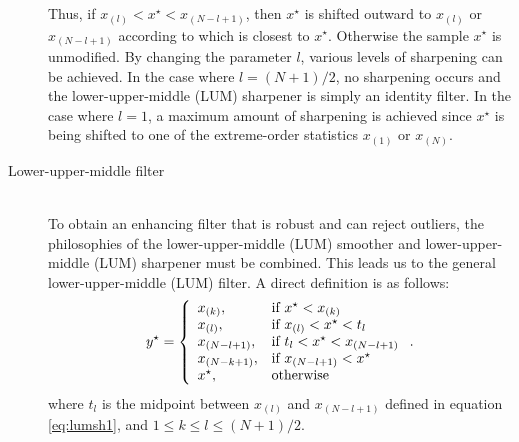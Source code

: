 \begin{description}
Thus, if $x_{(l)}<x^{\star}<x_{(N-l+1)}$, then $x^{\star}$ is shifted outward to
$x_{(l)}$ or $x_{(N-l+1)}$ according to which is closest to
$x^{\star}$. Otherwise the sample $x^{\star}$ is unmodified. By changing the
parameter $l$, various levels of sharpening can be achieved.  In the
case where $l=(N+1)/2$, no sharpening occurs and the
lower-upper-middle (LUM) sharpener is simply an
identity filter. In the case where $l=1$, a maximum amount of
sharpening is achieved since $x^{\star}$ is being shifted to one of the
extreme-order statistics $x_{(1)}$ or $x_{(N)}$.

     \item[Lower-upper-middle filter] \ \\
To obtain an enhancing filter that is robust and can reject outliers,
the philosophies of the lower-upper-middle (LUM)
smoother and lower-upper-middle (LUM) sharpener must be
combined. This leads us to the general
lower-upper-middle (LUM) filter. A direct definition is
as follows: 
\begin{equation} 
  y^{\star} = \left\{
\begin{array}{ll} x_{(k)}, & \textrm{if $ x^{\star} < x_{(k)}$}\\ x_{(l)}, &
\textrm{if $ x_{(l)} < x^{\star} < t_l$}\\ x_{(N-l+1)}, & \textrm{if $ t_l <
x^{\star} < x_{(N-l+1)}$}\\ x_{(N-k+1)}, & \textrm{if $ x_{(N-l+1)} <
x^{\star}$}\\ x^{\star}, & \textrm{otherwise}
\end{array} \right..
  \label{eq:lum5} 
\end{equation}
where $t_l$ is the midpoint between $x_{(l)}$ and $x_{(N-l+1)}$
defined in equation
\ref{eq:lumsh1}, and  $1 \le k \le l \le (N+1)/2$.
\end{description}




%


